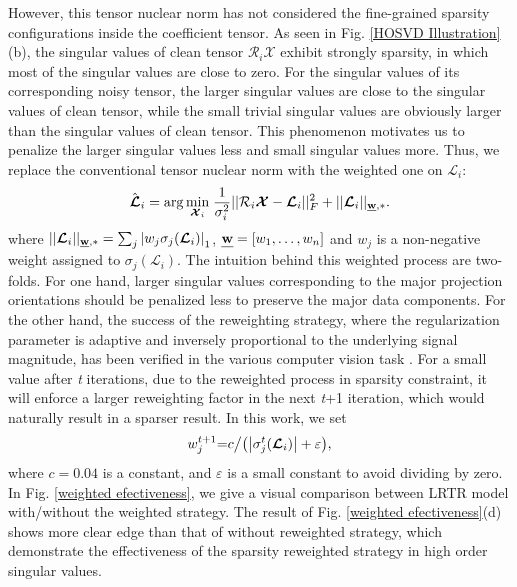 \documentclass[twocolumn]{svjour3}          %
\begin{document}
    However, this tensor nuclear norm has not considered the fine-grained sparsity configurations inside the coefficient tensor. As seen in Fig. \ref{HOSVD Illustration}(b), the singular values of clean tensor ${{\mathcal{R}}_i}{\boldsymbol{\mathcal{X}}}$ exhibit strongly sparsity, in which most of the singular values are close to zero. For the singular values of its corresponding noisy tensor, the larger singular values are close to the singular values of clean tensor, while the small trivial singular values are obviously larger than the singular values of clean tensor. This phenomenon motivates us to penalize the larger singular values less and small singular values more. Thus, we replace the conventional tensor nuclear norm with the weighted one on ${\boldsymbol{\mathcal{L}}_i}$:
    \begin{equation}\label{eq:Weighted Tensor Nuclear Norm}
    \setlength{\abovedisplayskip}{2pt}
    \setlength{\belowdisplayskip}{2pt}
    {\hat{\boldsymbol{\mathcal{L}}}_i} = \arg \mathop {\min }\limits_{{\boldsymbol{\mathcal{X}}_i}} {\kern 1pt} \frac{1}{{\sigma _i^2}}||{{\mathcal{R}}_i}{\boldsymbol{\mathcal{X}}} - {\boldsymbol{\mathcal{L}}_i}||_F^2 + ||{\boldsymbol{\mathcal{L}}_i}|{|_{\emph{\textbf{w}}, * }}.
    \end{equation}
    where $||{\boldsymbol{\mathcal{L}}_i}|{|_{\emph{\textbf{w}}, * }} = {\sum\nolimits_j {\left| {{w_j}{\sigma _j}({\boldsymbol{\mathcal{L}}_i})} \right|} _1}$, $\textbf{\emph{w}} = [{w_1}, \ldots ,{w_n}]$ and ${w_j}$ is a non-negative weight assigned to ${\sigma _j}({\boldsymbol{\mathcal{L}}_i})$. The intuition behind this weighted process are two-folds. For one hand, larger singular values corresponding to the major projection orientations should be penalized less to preserve the major data components. For the other hand, the success of the reweighting strategy, where the regularization parameter is adaptive and inversely proportional to the underlying signal magnitude, has been verified in the various computer vision task \cite{candes2008enhancing, Yan2013Nonlocal}. For a small value after \emph{t} iterations, due to the reweighted process in sparsity constraint, it will enforce a larger reweighting factor in the next \emph{t}+1 iteration, which would naturally result in a sparser result. In this work, we set
    \begin{equation}\label{eq:Weighted Definition}
    \setlength{\abovedisplayskip}{2pt}
    \setlength{\belowdisplayskip}{2pt}
    w_j^{t + 1}{\rm{ = }}{c \mathord{\left/
    {\vphantom {c {\left( {\left| {\sigma _j^t({\cal X})} \right| + \varepsilon } \right)}}} \right.
    \kern-\nulldelimiterspace} {\left( {\left| {\sigma _j^t({\boldsymbol{\mathcal{L}}_i})} \right| + \varepsilon } \right)}},
    \end{equation}
    where $c = 0.04$ is a constant, and $\varepsilon$ is a small constant to avoid dividing by zero. In Fig. \ref{weighted efectiveness}, we give a visual comparison between LRTR model with/without the weighted strategy. The result of Fig. \ref{weighted efectiveness}(d) shows more clear edge than that of without reweighted strategy, which demonstrate the effectiveness of the sparsity reweighted strategy in high order singular values.
\end{document}
